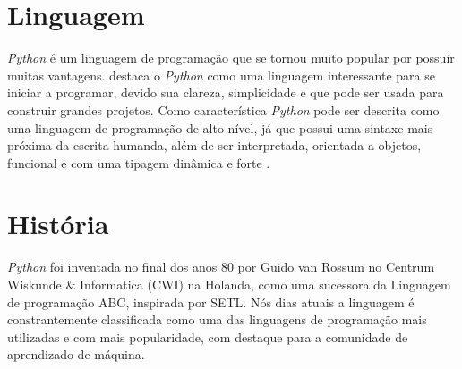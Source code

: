 \section{Linguagem}
\indent \textit{Python} é um linguagem de programação que se tornou muito popular por possuir muitas vantagens. \cite{menezes2010introduccao} destaca o \textit{Python} como uma linguagem interessante para se iniciar a programar, devido sua clareza, simplicidade e que pode ser usada para construir grandes projetos. Como característica \textit{Python} pode ser descrita como uma linguagem de programação de alto nível, já que possui uma sintaxe mais próxima da escrita humanda, além de ser interpretada, orientada a objetos, funcional e com uma tipagem dinâmica e forte \cite{wiki:python}.

\section{História}

\indent \textit{Python} foi inventada no final dos anos 80 por Guido van Rossum no Centrum Wiskunde \& Informatica (CWI) na Holanda, como uma sucessora da Linguagem de programação ABC, inspirada por SETL. Nós dias atuais a linguagem é constrantemente classificada como uma das linguagens de programação mais utilizadas e com mais popularidade, com destaque para a comunidade de aprendizado de máquina. \cite{wiki:python}